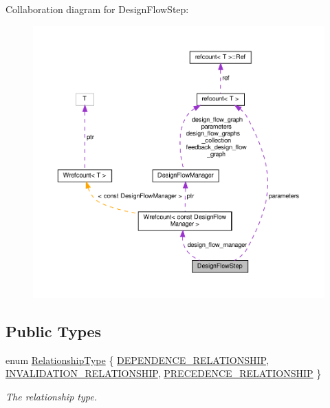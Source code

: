 Collaboration diagram for Design\+Flow\+Step\+:
\nopagebreak
\begin{figure}[H]
\begin{center}
\leavevmode
\includegraphics[width=350pt]{d4/d04/classDesignFlowStep__coll__graph}
\end{center}
\end{figure}
\subsection*{Public Types}
\begin{DoxyCompactItemize}
\item 
enum \hyperlink{classDesignFlowStep_a723a3baf19ff2ceb77bc13e099d0b1b7}{Relationship\+Type} \{ \hyperlink{classDesignFlowStep_a723a3baf19ff2ceb77bc13e099d0b1b7a9764ade006f899d5cc8eecf26f4d878a}{D\+E\+P\+E\+N\+D\+E\+N\+C\+E\+\_\+\+R\+E\+L\+A\+T\+I\+O\+N\+S\+H\+IP}, 
\hyperlink{classDesignFlowStep_a723a3baf19ff2ceb77bc13e099d0b1b7a568a09094d86faaf6037c4f62f4236a9}{I\+N\+V\+A\+L\+I\+D\+A\+T\+I\+O\+N\+\_\+\+R\+E\+L\+A\+T\+I\+O\+N\+S\+H\+IP}, 
\hyperlink{classDesignFlowStep_a723a3baf19ff2ceb77bc13e099d0b1b7a1505b23f7a905247d6a875e7667ace48}{P\+R\+E\+C\+E\+D\+E\+N\+C\+E\+\_\+\+R\+E\+L\+A\+T\+I\+O\+N\+S\+H\+IP}
 \}\begin{DoxyCompactList}\small\item\em The relationship type. \end{DoxyCompactList}
\end{DoxyCompactItemize}
